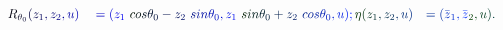 \documentclass[12pt]{article}
\begin{document}
\makeatletter
\renewcommand*{\@textcolor}[3]{%
  \protect\leavevmode
  \begingroup
    \color#1{#2}#3%
  \endgroup
}
\makeatother
\begin{displaymath}
\begin{array} {rlr} \displaystyle { \mathcolor[RGB]{0,0,15}{R} _ { \mathcolor[RGB]{0,0,30}{\theta} _ { \mathcolor[RGB]{0,0,45}{0} } } \mathcolor[RGB]{0,0,60}{(} \mathcolor[RGB]{0,0,75}{z} _ { \mathcolor[RGB]{0,0,90}{1} } \mathcolor[RGB]{0,0,105}{,} \mathcolor[RGB]{0,0,120}{z} _ { \mathcolor[RGB]{0,0,135}{2} } \mathcolor[RGB]{0,0,150}{,} \mathcolor[RGB]{0,0,165}{u} \mathcolor[RGB]{0,0,180}{)} } & \displaystyle { { } \mathcolor[RGB]{0,0,195}{=} \mathcolor[RGB]{0,0,210}{(} \mathcolor[RGB]{0,0,225}{z} _ { \mathcolor[RGB]{0,0,240}{1} } \mathcolor[RGB]{0,0,255}{\operatorname*} { \mathcolor[RGB]{0,15,0}{c} \mathcolor[RGB]{0,15,15}{o} \mathcolor[RGB]{0,15,30}{s} } \mathcolor[RGB]{0,15,45}{\theta} _ { \mathcolor[RGB]{0,15,60}{0} } \mathcolor[RGB]{0,15,75}{-} \mathcolor[RGB]{0,15,90}{z} _ { \mathcolor[RGB]{0,15,105}{2} } \mathcolor[RGB]{0,15,120}{\operatorname*} { \mathcolor[RGB]{0,15,135}{s} \mathcolor[RGB]{0,15,150}{i} \mathcolor[RGB]{0,15,165}{n} } \mathcolor[RGB]{0,15,180}{\theta} _ { \mathcolor[RGB]{0,15,195}{0} } \mathcolor[RGB]{0,15,210}{,} \mathcolor[RGB]{0,15,225}{z} _ { \mathcolor[RGB]{0,15,240}{1} } \mathcolor[RGB]{0,15,255}{\operatorname*} { \mathcolor[RGB]{0,30,0}{s} \mathcolor[RGB]{0,30,15}{i} \mathcolor[RGB]{0,30,30}{n} } \mathcolor[RGB]{0,30,45}{\theta} _ { \mathcolor[RGB]{0,30,60}{0} } \mathcolor[RGB]{0,30,75}{+} \mathcolor[RGB]{0,30,90}{z} _ { \mathcolor[RGB]{0,30,105}{2} } \mathcolor[RGB]{0,30,120}{\operatorname*} { \mathcolor[RGB]{0,30,135}{c} \mathcolor[RGB]{0,30,150}{o} \mathcolor[RGB]{0,30,165}{s} } \mathcolor[RGB]{0,30,180}{\theta} _ { \mathcolor[RGB]{0,30,195}{0} } \mathcolor[RGB]{0,30,210}{,} \mathcolor[RGB]{0,30,225}{u} \mathcolor[RGB]{0,30,240}{)} \mathcolor[RGB]{0,30,255}{;} \mathcolor[RGB]{0,45,0}{\eta} \mathcolor[RGB]{0,45,15}{(} \mathcolor[RGB]{0,45,30}{z} _ { \mathcolor[RGB]{0,45,45}{1} } \mathcolor[RGB]{0,45,60}{,} \mathcolor[RGB]{0,45,75}{z} _ { \mathcolor[RGB]{0,45,90}{2} } \mathcolor[RGB]{0,45,105}{,} \mathcolor[RGB]{0,45,120}{u} \mathcolor[RGB]{0,45,135}{)} } & \displaystyle { \mathcolor[RGB]{0,45,150}{=} \mathcolor[RGB]{0,45,165}{(} {\mathcolor[RGB]{0,45,180}{\bar { \mathcolor[RGB]{0,45,195}{z} } }} _ { \mathcolor[RGB]{0,45,210}{1} } \mathcolor[RGB]{0,45,225}{,} {\mathcolor[RGB]{0,45,240}{\bar { \mathcolor[RGB]{0,45,255}{z} } }} _ { \mathcolor[RGB]{0,60,0}{2} } \mathcolor[RGB]{0,60,15}{,} \mathcolor[RGB]{0,60,30}{u} \mathcolor[RGB]{0,60,45}{)} \mathcolor[RGB]{0,60,60}{.} } \end{array}
\end{displaymath}
\end{document}
